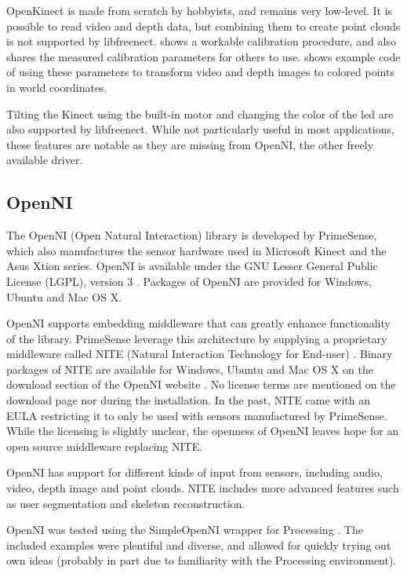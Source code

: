 OpenKinect is made from scratch by hobbyists, and remains very low-level. It is possible to read video and depth data, but combining them to create point clouds is not supported by libfreenect. \citet{burrus2010} shows a workable calibration procedure, and also shares the measured calibration parameters for others to use. \citet{fisher2010} shows example code of using these parameters to transform video and depth images to colored points in world coordinates.

Tilting the Kinect using the built-in motor and changing the color of the led are also supported by libfreenect. While not particularly useful in most applications, these features are notable as they are missing from OpenNI, the other freely available driver.

\subsection{OpenNI}

The OpenNI (Open Natural Interaction) library \citep{OpenNI} is developed by PrimeSense, which also manufactures the sensor hardware used in Microsoft Kinect and the Asus Xtion series. OpenNI is available under the GNU Lesser General Public License (LGPL), version 3 \citep{LGPL3}. Packages of OpenNI are provided for Windows, Ubuntu and Mac OS X.

OpenNI supports embedding middleware that can greatly enhance functionality of the library. PrimeSense leverage this architecture by supplying a proprietary middleware called NITE (Natural Interaction Technology for End-user) \citep{NITE}. Binary packages of NITE are available for Windows, Ubuntu and Mac OS X on the download section of the OpenNI website \citep{OpenNI}. No license terms are mentioned on the download page nor during the installation. In the past, NITE came with an EULA restricting it to only be used with sensors manufactured by PrimeSense. While the licensing is slightly unclear, the openness of OpenNI leaves hope for an open source middleware replacing NITE.

OpenNI has support for different kinds of input from sensors, including audio, video, depth image and point clouds. NITE includes more advanced features such as user segmentation and skeleton reconstruction.

OpenNI was tested using the SimpleOpenNI \citep{simpleopenni} wrapper for Processing \citep{processing}. The included examples were plentiful and diverse, and allowed for quickly trying out own ideas (probably in part due to familiarity with the Processing environment).


